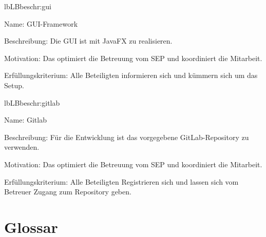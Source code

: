 \begin{description}[leftmargin=5em, style=sameline]
	\begin{lhp}{lb}{LB}{beschr:gui}
		\item [Name:] GUI-Framework
		\item [Beschreibung:] Die GUI ist mit JavaFX zu realisieren.
		\item [Motivation:] Das optimiert die Betreuung vom SEP und koordiniert die Mitarbeit.
		\item [Erfüllungskriterium:] Alle Beteiligten informieren sich und kümmern sich um das Setup.
	\end{lhp}
	
	\begin{lhp}{lb}{LB}{beschr:gitlab}
		\item [Name:] Gitlab
		\item [Beschreibung:] Für die Entwicklung ist das vorgegebene GitLab-Repository zu verwenden.
		\item [Motivation:] Das optimiert die Betreuung vom SEP und koordiniert die Mitarbeit.
		\item [Erfüllungskriterium:] Alle Beteiligten Registrieren sich und lassen sich vom Betreuer Zugang zum Repository geben.
	\end{lhp}
	
	
\end{description}

\section{Glossar}

